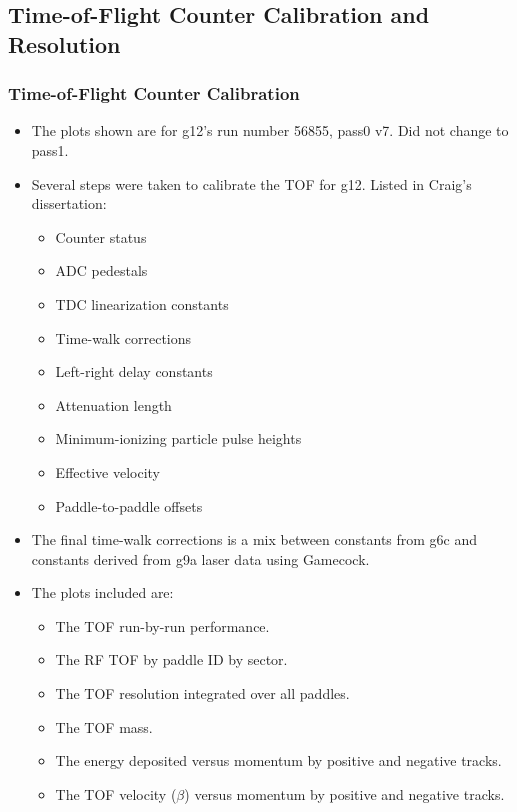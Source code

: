 \subsection{\label{sec:calib.tof}Time-of-Flight Counter Calibration and Resolution}

\subsubsection{\label{sec:calib.tof.calib}Time-of-Flight Counter Calibration}

\begin{itemize}
	\item The plots shown are for g12's run number 56855, pass0 v7. Did not change to pass1. 
	\item Several steps were taken to calibrate the TOF for g12. Listed in Craig's dissertation:
	\begin{itemize}
		\item Counter status
		\item ADC pedestals
		\item TDC linearization constants
		\item Time-walk corrections
		\item Left-right delay constants
		\item Attenuation length
		\item Minimum-ionizing particle pulse heights
		\item Effective velocity
		\item Paddle-to-paddle offsets
	\end{itemize}
	\item The final time-walk corrections is a mix between constants from g6c and constants derived from g9a laser data using Gamecock.
	\item The plots included are:
	\begin{itemize}
		\item The TOF run-by-run performance.
		\item The RF TOF by paddle ID by sector.
		\item The TOF resolution integrated over all paddles.
		\item The TOF mass.
		\item The energy deposited versus momentum by positive and negative tracks.
		\item The TOF velocity ($\beta$) versus momentum by positive and negative tracks.
	\end{itemize}
\end{itemize}

